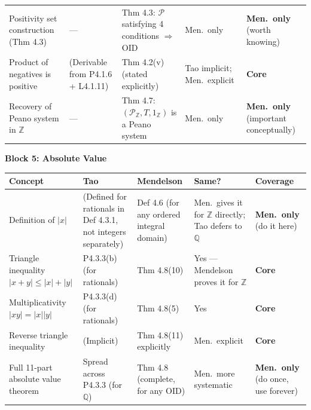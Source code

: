 \begin{tabular}{p{} p{} p{} p{} p{}}
Positivity set construction (Thm 4.3)
& ---
& Thm 4.3: $\mathcal{P}$ satisfying 4 conditions $\Rightarrow$ OID
& Men.\ only
& \textbf{Men.\ only} (worth knowing)
\\[6pt]

Product of negatives is positive
& (Derivable from P4.1.6 + L4.1.11)
& Thm 4.2(v) (stated explicitly)
& Tao implicit; Men.\ explicit
& \textbf{Core}
\\[6pt]

Recovery of Peano system in $\mathbb{Z}$
& ---
& Thm 4.7: $(\mathcal{P}_\mathbb{Z},T,1_\mathbb{Z})$ is a Peano system
& Men.\ only
& \textbf{Men.\ only} (important conceptually)
\\

\bottomrule
\end{tabular}

\begin{exposition}
\bigskip
\end{exposition}

\noindent\textbf{Block 5: Absolute Value}

\begin{exposition}
\smallskip
\end{exposition}
\begin{tabular}{p{} p{} p{} p{} p{}}
\toprule
\textbf{Concept} & \textbf{Tao} & \textbf{Mendelson} & \textbf{Same?} & \textbf{Coverage} \\
\midrule

Definition of $|x|$
& (Defined for rationals in Def 4.3.1, not integers separately)
& Def 4.6 (for any ordered integral domain)
& Men.\ gives it for $\mathbb{Z}$ directly; Tao defers to $\mathbb{Q}$
& \textbf{Men.\ only} (do it here)
\\[6pt]

Triangle inequality $|x+y|\leq|x|+|y|$
& P4.3.3(b) (for rationals)
& Thm 4.8(10)
& Yes --- Mendelson proves it for $\mathbb{Z}$
& \textbf{Core}
\\[6pt]

Multiplicativity $|xy|=|x||y|$
& P4.3.3(d) (for rationals)
& Thm 4.8(5)
& Yes
& \textbf{Core}
\\[6pt]

Reverse triangle inequality
& (Implicit)
& Thm 4.8(11) explicitly
& Men.\ explicit
& \textbf{Core}
\\[6pt]

Full 11-part absolute value theorem
& Spread across P4.3.3 (for $\mathbb{Q}$)
& Thm 4.8 (complete, for any OID)
& Men.\ more systematic
& \textbf{Men.\ only} (do once, use forever)
\\

\bottomrule
\end{tabular}

